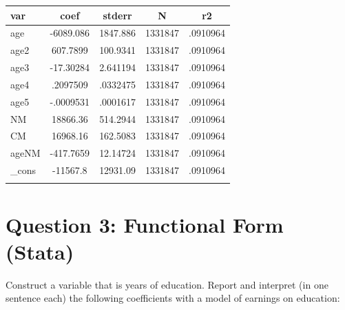 \documentclass{article}
\begin{document}
\begin{enumerate}[label=\alph*]
\begin{table}[tbp]
\begin{tabularx}{\textwidth}{lCCCC}
		\toprule
		{var}&{coef}&{stderr}&{N}&{r2} \tabularnewline
		\midrule\addlinespace[1.5ex]
		age&-6089.086&1847.886&1331847&.0910964 \tabularnewline
		age2&607.7899&100.9341&1331847&.0910964 \tabularnewline
		age3&-17.30284&2.641194&1331847&.0910964 \tabularnewline
		age4&.2097509&.0332475&1331847&.0910964 \tabularnewline
		age5&-.0009531&.0001617&1331847&.0910964 \tabularnewline
		NM&18866.36&514.2944&1331847&.0910964 \tabularnewline
		CM&16968.16&162.5083&1331847&.0910964 \tabularnewline
		ageNM&-417.7659&12.14724&1331847&.0910964 \tabularnewline
		\_cons&-11567.8&12931.09&1331847&.0910964 \tabularnewline
		\bottomrule \addlinespace[1.5ex]
		
	\end{tabularx}
\end{table}

\end{enumerate}

\section{Question 3:  Functional Form (Stata)}
Construct a variable that is years of education. Report and interpret (in one sentence each) the following coefficients with a model of earnings on education:
\end{document}
